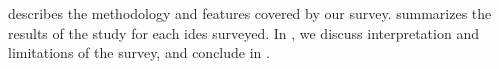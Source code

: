 
 describes the methodology and features covered by our survey.
 summarizes the results of the study for each \acp{ide} surveyed.
In , we discuss interpretation and limitations of the survey, and conclude in .

